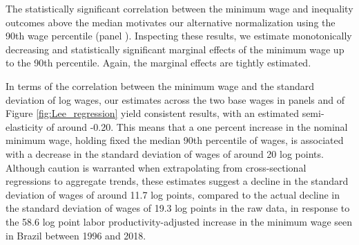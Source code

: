 The statistically significant correlation between the minimum wage and inequality outcomes above the median motivates our alternative normalization using the 90th wage percentile (panel ). Inspecting these results, we estimate monotonically decreasing and statistically significant marginal effects of the minimum wage up to the 90th percentile. Again, the marginal effects are tightly estimated.

In terms of the correlation between the minimum wage and the standard deviation of log wages, our estimates across the two base wages in panels  and  of Figure \ref{fig:Lee_regression} yield consistent results, with an estimated semi-elasticity of around -0.20. This means that a one percent increase in the nominal minimum wage, holding fixed the median 90th percentile of wages, is associated with a decrease in the standard deviation of wages of around 20 log points. Although caution is warranted when extrapolating from cross-sectional regressions to aggregate trends, these estimates suggest a decline in the standard deviation of wages of around 11.7 log points, compared to the actual decline in the standard deviation of wages of 19.3 log points in the raw data, in response to the 58.6 log point labor productivity-adjusted increase in the minimum wage seen in Brazil between 1996 and 2018.

